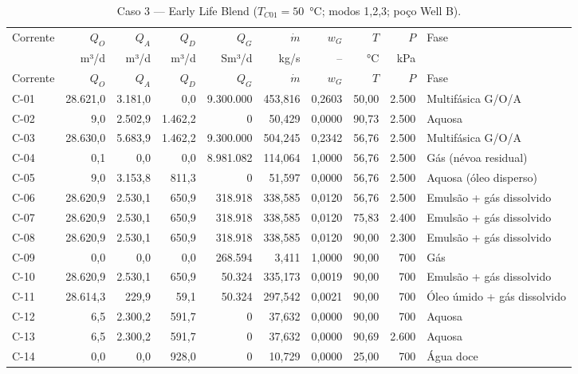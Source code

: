 \documentclass[11pt,a4paper]{article}
\numberwithin{equation}{section}
\numberwithin{table}{section}
\numberwithin{figure}{section}
\begin{document}
{\footnotesize\setlength{\tabcolsep}{3pt}\begin{longtable}{lrrrrrrrrL{2.5cm}}
\caption{Caso 3 --- Early Life Blend ($T_{C01}=50$~°C; modos 1,2,3; poço Well B).}\\\toprule
Corrente & $Q_O$ & $Q_A$ & $Q_D$ & $Q_G$ & $\dot m$ & $w_G$ & $T$ & $P$ & Fase\\ & m³/d & m³/d & m³/d & Sm³/d & kg/s & -- & °C & kPa & \\\midrule\endfirsthead
\toprule Corrente & $Q_O$ & $Q_A$ & $Q_D$ & $Q_G$ & $\dot m$ & $w_G$ & $T$ & $P$ & Fase\\\midrule\endhead
C-01 & 28.621,0 & 3.181,0 & 0,0 & 9.300.000 & 453,816 & 0,2603 & 50,00 & 2.500 & {\scriptsize Multifásica G/O/A}\\
C-02 & 9,0 & 2.502,9 & 1.462,2 & 0 & 50,429 & 0,0000 & 90,73 & 2.500 & {\scriptsize Aquosa}\\
C-03 & 28.630,0 & 5.683,9 & 1.462,2 & 9.300.000 & 504,245 & 0,2342 & 56,76 & 2.500 & {\scriptsize Multifásica G/O/A}\\
C-04 & 0,1 & 0,0 & 0,0 & 8.981.082 & 114,064 & 1,0000 & 56,76 & 2.500 & {\scriptsize Gás (névoa residual)}\\
C-05 & 9,0 & 3.153,8 & 811,3 & 0 & 51,597 & 0,0000 & 56,76 & 2.500 & {\scriptsize Aquosa (óleo disperso)}\\
C-06 & 28.620,9 & 2.530,1 & 650,9 & 318.918 & 338,585 & 0,0120 & 56,76 & 2.500 & {\scriptsize Emulsão + gás dissolvido}\\
C-07 & 28.620,9 & 2.530,1 & 650,9 & 318.918 & 338,585 & 0,0120 & 75,83 & 2.400 & {\scriptsize Emulsão + gás dissolvido}\\
C-08 & 28.620,9 & 2.530,1 & 650,9 & 318.918 & 338,585 & 0,0120 & 90,00 & 2.300 & {\scriptsize Emulsão + gás dissolvido}\\
C-09 & 0,0 & 0,0 & 0,0 & 268.594 & 3,411 & 1,0000 & 90,00 & 700 & {\scriptsize Gás}\\
C-10 & 28.620,9 & 2.530,1 & 650,9 & 50.324 & 335,173 & 0,0019 & 90,00 & 700 & {\scriptsize Emulsão + gás dissolvido}\\
C-11 & 28.614,3 & 229,9 & 59,1 & 50.324 & 297,542 & 0,0021 & 90,00 & 700 & {\scriptsize Óleo úmido + gás dissolvido}\\
C-12 & 6,5 & 2.300,2 & 591,7 & 0 & 37,632 & 0,0000 & 90,00 & 700 & {\scriptsize Aquosa}\\
C-13 & 6,5 & 2.300,2 & 591,7 & 0 & 37,632 & 0,0000 & 90,69 & 2.600 & {\scriptsize Aquosa}\\
C-14 & 0,0 & 0,0 & 928,0 & 0 & 10,729 & 0,0000 & 25,00 & 700 & {\scriptsize Água doce}\\

\end{longtable}}
\end{document}
